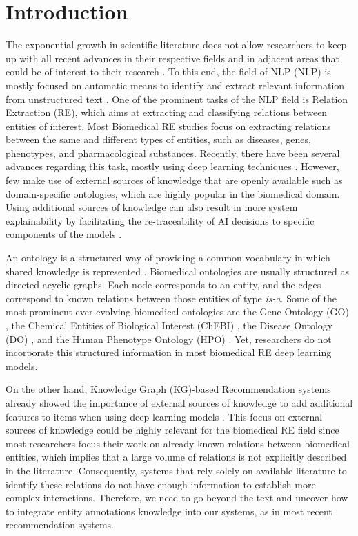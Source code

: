 \section{Introduction}

The exponential growth in scientific literature does not allow researchers to keep up with all recent advances in their respective fields and in adjacent areas that could be of interest to their research \citep{10.1371/journal.pbio.2005343}. 
To this end, the field of \acl{NLP} (NLP) is mostly focused on automatic means to identify and extract relevant information from unstructured text \citep{indurkhya2010handbook, 9086146}. One of the prominent tasks of the NLP field is Relation Extraction (RE), which aims at extracting and classifying relations between entities of interest. Most Biomedical RE studies focus on extracting relations between the same and different types of entities, such as diseases, genes, phenotypes, and pharmacological substances. Recently, there have been several advances regarding this task, mostly using deep learning techniques \citep{8416973}. However, few make use of external sources of knowledge that are openly available such as domain-specific ontologies, which are highly popular in the biomedical domain. Using additional sources of knowledge can also result in more system explainability by facilitating the re-traceability of AI decisions to specific components of the models \citep{HOLZINGER202128}.

An ontology is a structured way of providing a common vocabulary in which shared knowledge is represented \citep{gruber1993translation}. Biomedical ontologies are usually structured as directed acyclic graphs. Each node corresponds to an entity, and the edges correspond to known relations between those entities of type \textit{is-a}. Some of the most prominent ever-evolving biomedical ontologies are the Gene Ontology (GO) \citep{gene2019gene}, the Chemical Entities of Biological Interest (ChEBI) \citep{hastings2012chebi}, the Disease Ontology (DO) \citep{schriml2012disease}, and the Human Phenotype Ontology (HPO) \citep{kohler2019expansion}. Yet, researchers do not incorporate this structured information in most biomedical RE deep learning models. 

On the other hand, Knowledge Graph (KG)-based Recommendation systems already showed the importance of external sources of knowledge to add additional features to items when using deep learning models \citep{10.1145/2827872,barros2019using,9216015}. This focus on external sources of knowledge could be highly relevant for the biomedical RE field since most researchers focus their work on already-known relations between biomedical entities, which implies that a large volume of relations is not explicitly described in the literature. Consequently, systems that rely solely on available literature to identify these relations do not have enough information to establish more complex interactions. Therefore, we need to go beyond the text and uncover how to integrate entity annotations knowledge into our systems, as in most recent recommendation systems. 

